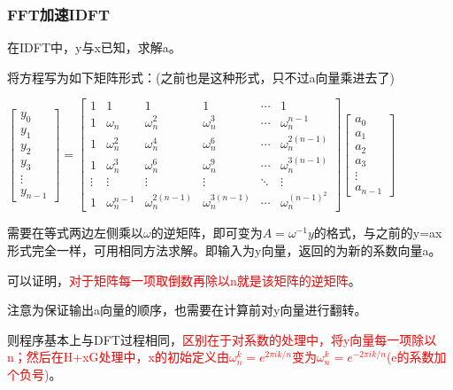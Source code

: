 \documentclass[UTF8]{article}%
\begin{document}
\subsubsection{FFT加速IDFT}

在IDFT中，y与x已知，求解a。

将方程写为如下矩阵形式：(之前也是这种形式，只不过a向量乘进去了)

$\left[\begin{array}{c}y_{0} \\ y_{1} \\ y_{2} \\ y_{3} \\ \vdots \\ y_{n-1}\end{array}\right]=\left[\begin{array}{cccccc}1 & 1 & 1 & 1 & \cdots & 1 \\ 1 & \omega_{n} & \omega_{n}^{2} & \omega_{n}^{3} & \cdots & \omega_{n}^{n-1} \\ 1 & \omega_{n}^{2} & \omega_{n}^{4} & \omega_{n}^{6} & \cdots & \omega_{n}^{2(n-1)} \\ 1 & \omega_{n}^{3} & \omega_{n}^{6} & \omega_{n}^{9} & \cdots & \omega_{n}^{3(n-1)} \\ \vdots & \vdots & \vdots & \vdots & \ddots & \vdots \\ 1 & \omega_{n}^{n-1} & \omega_{n}^{2(n-1)} & \omega_{n}^{3(n-1)} & \cdots & \omega_{n}^{(n-1)^2}\end{array}\right]\left[\begin{array}{c}a_{0} \\ a_{1} \\ a_{2} \\ a_{3} \\ \vdots \\ a_{n-1}\end{array}\right]$

需要在等式两边左侧乘以$\omega$的逆矩阵，即可变为$A=\omega^{-1}y$的格式，与之前的y=ax形式完全一样，可用相同方法求解。即输入为y向量，返回的为新的系数向量a。

可以证明，\textcolor{red}{对于矩阵每一项取倒数再除以n就是该矩阵的逆矩阵}。

注意为保证输出a向量的顺序，也需要在计算前对y向量进行翻转。

则程序基本上与DFT过程相同，\textcolor{red}{区别在于对系数的处理中，将y向量每一项除以n；然后在H+xG处理中，x的初始定义由$\omega_n^k=e^{{2\pi i k}/n}$变为$\omega_n^k=e^{-{2\pi i k}/n}$(e的系数加个负号)}。
\end{document}
